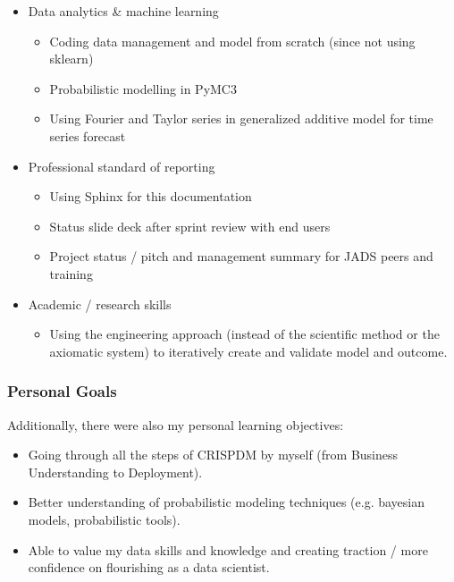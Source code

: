 \documentclass[letterpaper,10pt,english]{sphinxmanual}
\begin{document}
\begin{itemize}
\item {} 
Data analytics \& machine learning
\begin{itemize}
\item {} 
Coding data management and model from scratch (since not using sklearn)

\item {} 
Probabilistic modelling in PyMC3

\item {} 
Using Fourier and Taylor series in generalized additive model for time series forecast

\end{itemize}

\item {} 
Professional standard of reporting
\begin{itemize}
\item {} 
Using Sphinx for this documentation

\item {} 
Status slide deck after sprint review with end users

\item {} 
Project status / pitch and management summary for JADS peers and training

\end{itemize}

\item {} 
Academic / research skills
\begin{itemize}
\item {} 
Using the engineering approach (instead of the scientific method or the axiomatic system) to iteratively create and validate model and outcome.

\end{itemize}

\end{itemize}


\subsubsection{Personal Goals}
\label{\detokenize{deployment:personal-goals}}
Additionally, there were also my personal learning objectives:
\begin{itemize}
\item {} 
Going through all the steps of CRISP\sphinxhyphen{}DM by myself (from Business Understanding to Deployment).

\item {} 
Better understanding of probabilistic modeling techniques (e.g. bayesian models, probabilistic tools).

\item {} 
Able to value my data skills and knowledge and creating traction / more confidence on flourishing as a data scientist.

\end{itemize}
\end{document}
